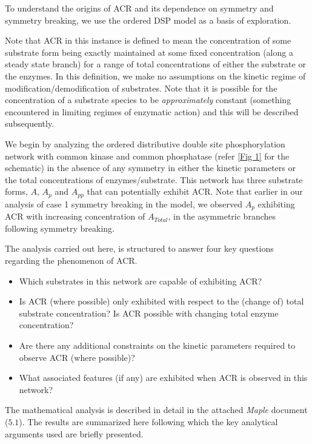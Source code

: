 \documentclass[9pt,lineno]{elife}
\begin{document}
\begin{appendixbox}
To understand the origins of ACR and its dependence on  symmetry and symmetry breaking, we use the ordered DSP model as a basis of exploration. 

Note that ACR in this instance is defined to mean the concentration of some substrate form being exactly maintained at some fixed concentration (along a steady state branch) for a range of total concentrations of either the substrate or the enzymes. In this definition, we make no assumptions on the kinetic regime of modification/demodification of substrates. Note that it is possible for the concentration of a substrate species to be \textit{approximately} constant (something encountered in limiting regimes of enzymatic action) and this will be described subsequently. 

We begin by analyzing the ordered distributive double site phosphorylation network with common kinase and common phosphatase (refer \cref{Fig 1} for the schematic) in the absence of any symmetry in either the kinetic parameters or the total concentrations of enzymes/substrate. This network has three substrate forms,  $A$, $A_p$ and $A_{pp}$ that can potentially exhibit ACR. Note that earlier in our analysis of case 1 symmetry breaking in the model, we observed $A_p$ exhibiting ACR with increasing concentration of $A_{Total}$, in the asymmetric branches following symmetry breaking. 

The analysis carried out here, is structured to answer four key questions regarding the phenomenon of ACR. 

\begin{itemize}
    \item Which substrates in this network are capable of exhibiting ACR?
    \item Is ACR (where possible) only exhibited with respect to the (change of) total substrate concentration? Is ACR possible with changing total enzyme concentration?
    \item Are there any additional constraints on the kinetic parameters required to observe ACR (where possible)? 
    \item What associated features (if any) are exhibited when ACR is observed in this network?
\end{itemize}

The mathematical analysis is described in detail in the attached \textit{Maple} document ($5.1$). The results are summarized here following which the key analytical arguments used are briefly presented.



\end{appendixbox}
\end{document}
